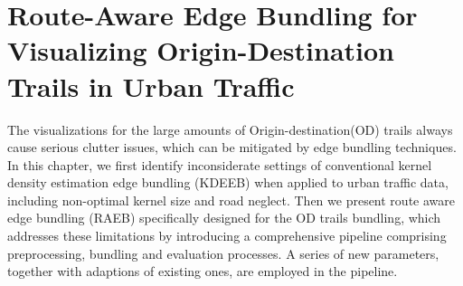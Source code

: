\chapter{Route-Aware Edge Bundling for Visualizing Origin-Destination Trails in Urban Traffic}\label{chap:c2_intro}

The visualizations for the large amounts of Origin-destination(OD) trails always cause serious clutter issues, which can be mitigated by edge bundling techniques. 
In this chapter, we first identify inconsiderate settings of conventional kernel density estimation edge bundling (KDEEB) when applied to urban traffic data, including non-optimal kernel size and road neglect. 
Then we present route aware edge bundling (RAEB) specifically designed for the OD trails bundling, which addresses these limitations by introducing a comprehensive pipeline comprising preprocessing, bundling and evaluation processes. A series of new parameters, together with adaptions of existing ones, are employed in the pipeline.














